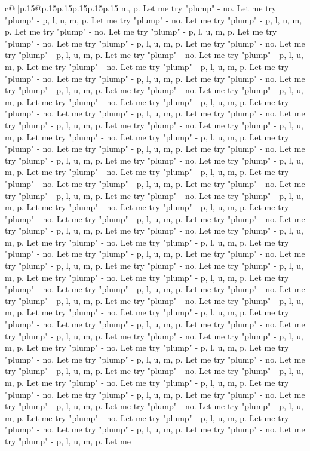 \documentclass{article}
\begin{document}
{\begin{supertabular}{c@{$\;$}|p{.15\linewidth}@{}p{.15\linewidth}p{.15\linewidth}p{.15\linewidth}p{.15\linewidth}p{.15\linewidth}}
{{{m, p. Let me try "plump" {-} no. Let me try "plump" {-} p, l, u, m, p. Let me try "plump" {-} no. Let me try "plump" {-} p, l, u, m, p. Let me try "plump" {-} no. Let me try "plump" {-} p, l, u, m, p. Let me try "plump" {-} no. Let me try "plump" {-} p, l, u, m, p. Let me try "plump" {-} no. Let me try "plump" {-} p, l, u, m, p. Let me try "plump" {-} no. Let me try "plump" {-} p, l, u, m, p. Let me try "plump" {-} no. Let me try "plump" {-} p, l, u, m, p. Let me try "plump" {-} no. Let me try "plump" {-} p, l, u, m, p. Let me try "plump" {-} no. Let me try "plump" {-} p, l, u, m, p. Let me try "plump" {-} no. Let me try "plump" {-} p, l, u, m, p. Let me try "plump" {-} no. Let me try "plump" {-} p, l, u, m, p. Let me try "plump" {-} no. Let me try "plump" {-} p, l, u, m, p. Let me try "plump" {-} no. Let me try "plump" {-} p, l, u, m, p. Let me try "plump" {-} no. Let me try "plump" {-} p, l, u, m, p. Let me try "plump" {-} no. Let me try "plump" {-} p, l, u, m, p. Let me try "plump" {-} no. Let me try "plump" {-} p, l, u, m, p. Let me try "plump" {-} no. Let me try "plump" {-} p, l, u, m, p. Let me try "plump" {-} no. Let me try "plump" {-} p, l, u, m, p. Let me try "plump" {-} no. Let me try "plump" {-} p, l, u, m, p. Let me try "plump" {-} no. Let me try "plump" {-} p, l, u, m, p. Let me try "plump" {-} no. Let me try "plump" {-} p, l, u, m, p. Let me try "plump" {-} no. Let me try "plump" {-} p, l, u, m, p. Let me try "plump" {-} no. Let me try "plump" {-} p, l, u, m, p. Let me try "plump" {-} no. Let me try "plump" {-} p, l, u, m, p. Let me try "plump" {-} no. Let me try "plump" {-} p, l, u, m, p. Let me try "plump" {-} no. Let me try "plump" {-} p, l, u, m, p. Let me try "plump" {-} no. Let me try "plump" {-} p, l, u, m, p. Let me try "plump" {-} no. Let me try "plump" {-} p, l, u, m, p. Let me try "plump" {-} no. Let me try "plump" {-} p, l, u, m, p. Let me try "plump" {-} no. Let me try "plump" {-} p, l, u, m, p. Let me try "plump" {-} no. Let me try "plump" {-} p, l, u, m, p. Let me try "plump" {-} no. Let me try "plump" {-} p, l, u, m, p. Let me try "plump" {-} no. Let me try "plump" {-} p, l, u, m, p. Let me try "plump" {-} no. Let me try "plump" {-} p, l, u, m, p. Let me try "plump" {-} no. Let me try "plump" {-} p, l, u, m, p. Let me try "plump" {-} no. Let me try "plump" {-} p, l, u, m, p. Let me try "plump" {-} no. Let me try "plump" {-} p, l, u, m, p. Let me try "plump" {-} no. Let me try "plump" {-} p, l, u, m, p. Let me try "plump" {-} no. Let me try "plump" {-} p, l, u, m, p. Let me try "plump" {-} no. Let me try "plump" {-} p, l, u, m, p. Let me try "plump" {-} no. Let me try "plump" {-} p, l, u, m, p. Let me try "plump" {-} no. Let me try "plump" {-} p, l, u, m, p. Let me try "plump" {-} no. Let me try "plump" {-} p, l, u, m, p. Let me try "plump" {-} no. Let me try "plump" {-} p, l, u, m, p. Let me try "plump" {-} no. Let me try "plump" {-} p, l, u, m, p. Let me try "plump" {-} no. Let me try "plump" {-} p, l, u, m, p. Let me try "plump" {-} no. Let me try "plump" {-} p, l, u, m, p. Let me try "plump" {-} no. Let me try "plump" {-} p, l, u, m, p. Let me try "plump" {-} no. Let me try "plump" {-} p, l, u, m, p. Let me }}}
\end{supertabular}}
\end{document}
